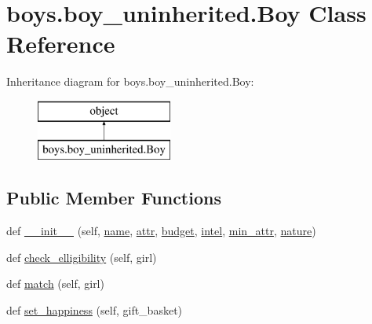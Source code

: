 \hypertarget{classboys_1_1boy__uninherited_1_1_boy}{}\section{boys.\+boy\+\_\+uninherited.\+Boy Class Reference}
\label{classboys_1_1boy__uninherited_1_1_boy}
Inheritance diagram for boys.\+boy\+\_\+uninherited.\+Boy\+:\begin{figure}[H]
\begin{center}
\leavevmode
\includegraphics[height=2.000000cm]{classboys_1_1boy__uninherited_1_1_boy}
\end{center}
\end{figure}
\subsection*{Public Member Functions}
\begin{DoxyCompactItemize}
\item 
def \hyperlink{classboys_1_1boy__uninherited_1_1_boy_a0e3ae5ced04e7737f82917d5272860c0}{\+\_\+\+\_\+init\+\_\+\+\_\+} (self, \hyperlink{classboys_1_1boy__uninherited_1_1_boy_a4009413656c9d8057fc54545dce28df8}{name}, \hyperlink{classboys_1_1boy__uninherited_1_1_boy_afac2cde2111761c12ac48f3339f4c659}{attr}, \hyperlink{classboys_1_1boy__uninherited_1_1_boy_a0abd7cec036a08b7d7fb23db1709246d}{budget}, \hyperlink{classboys_1_1boy__uninherited_1_1_boy_a8069384d8d8dd16683ba292ac2b043b0}{intel}, \hyperlink{classboys_1_1boy__uninherited_1_1_boy_a95366dbf37df96f53c361a980791f4e7}{min\+\_\+attr}, \hyperlink{classboys_1_1boy__uninherited_1_1_boy_aea7eb7c4e32a8490a7280a8cb99f036d}{nature})
\item 
def \hyperlink{classboys_1_1boy__uninherited_1_1_boy_a833caeabdf27b25b3435776e01536b29}{check\+\_\+elligibility} (self, girl)
\item 
def \hyperlink{classboys_1_1boy__uninherited_1_1_boy_a1a8cc5381fb5b2fbd68698fc0791db97}{match} (self, girl)
\item 
def \hyperlink{classboys_1_1boy__uninherited_1_1_boy_a7a7071d13af4d9d43dd6a4eddbb4d55e}{set\+\_\+happiness} (self, gift\+\_\+basket)
\end{DoxyCompactItemize}
